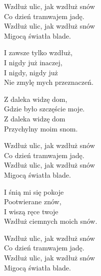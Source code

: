 \begin{text}
    Wzdłuż ulic, jak wzdłuż snów\\
    Co dzień tramwajem jadę.\\
    Wzdłuż ulic, jak wzdłuż snów\\
    Migocą światła blade.

    I zawsze tylko wzdłuż,\\
    I nigdy już inaczej,\\
    I nigdy, nigdy już\\
    Nie zmylę mych przeznaczeń.

    Z daleka widzę dom,\\
    Gdzie było szczęście moje.\\
    Z daleka widzę dom\\
    Przychylny moim snom.

    Wzdłuż ulic, jak wzdłuż snów\\
    Co dzień tramwajem jadę.\\
    Wzdłuż ulic, jak wzdłuż snów\\
    Migocą światła blade.

    I śnią mi się pokoje\\
    Pootwierane znów,\\
    I wiszą ręce twoje\\
    Wzdłuż ciemnych moich snów.

    Wzdłuż ulic, jak wzdłuż snów\\
    Co dzień tramwajem jadę.\\
    Wzdłuż ulic, jak wzdłuż snów\\
    Migocą światła blade.
\end{text}
\begin{chord}

\end{chord}